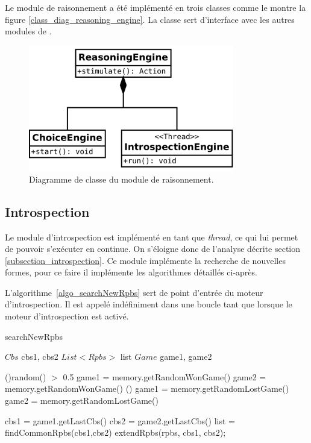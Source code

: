 
Le module de raisonnement a été implémenté en trois classes comme le montre la figure \vref{class_diag_reasoning_engine}. La classe  sert d'interface avec les autres modules de \cogito{}. 

\begin{figure}[H] 
\center
\includegraphics[width=0.8\textwidth]{files/class_diagram/reasoningEngine} 
\caption{Diagramme de classe du module de raisonnement.}
\label{class_diag_reasoning_engine}
\end{figure}

\subsection{Introspection}


Le module d'introspection est implémenté en tant que \emph{thread}, ce qui lui permet de pouvoir s'exécuter en continue. On s'éloigne donc de l'analyse décrite section \vref{subsection_introspection}. Ce module implémente la recherche de nouvelles formes, pour ce faire il implémente les algorithmes détaillés ci-après.


L'algorithme~\vref{algo_searchNewRpbs} sert de point d'entrée du moteur d'introspection. Il est appelé indéfiniment dans une boucle \og tant que \fg{} lorsque le moteur d'introspection est activé.


\begin{algorithm}[H]
	\caption{searchNewRpbs}
	\label{algo_searchNewRpbs}
  \vspace{0.2cm}
  
	$Cbs$ cbs1, cbs2\;
	$List<Rpbs>$ list\;	
	$Game$ game1, game2\;
	
	\eIf(){random() $>$ 0.5}
		{
			game1 = memory.getRandomWonGame()\;
			{
				game2 = memory.getRandomWonGame()\;
			}
		}()
		{
			game1 = memory.getRandomLostGame()\;
			{
				game2 = memory.getRandomLostGame()\;
			}
		}
  \vspace{0.2cm}
  
	cbs1 = game1.getLastCbs()\;
	cbs2 = game2.getLastCbs()\;
		{ 
			list = findCommonRpbs(cbs1,cbs2)\;
			{
				extendRpbs(rpbs, cbs1, cbs2);
			}
		}
		
\end{algorithm}

